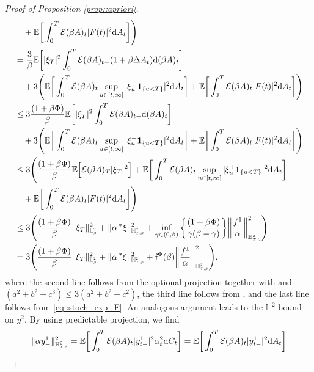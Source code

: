 \documentclass[10pt]{article} %
\newcommand\cE{\mathcal E}
\newcommand{\smalltext}[1]{\text{\fontsize{4}{4}\selectfont$#1$}}
\newcommand\ff{\mathfrak f}
\def \E{\mathbb{E}}
\def \H{\mathbb{H}}
\def \L{\mathbb{L}}
\newcommand{\brs}[1]{\prescript{\ast}{}{#1}}
\newcommand{\1}{\mathbf{1}}
\def\d{\mathrm{d}}
\begin{document}
\begin{proof}[Proof of Proposition \ref{prop::apriori}]
\begin{align*}
	&\quad+ \E \bigg[ \int_0^T \cE(\beta A)_t |F(t)|^2 \d A_t \bigg] \Bigg) \\
	&= \frac{3}{\beta}\E \bigg[ |\xi_T|^2 \int_0^T \cE(\beta A)_{t-}(1+\beta\Delta A_t) \d (\beta A)_t \bigg] \\
	&\quad+3\Bigg( \E \bigg[ \int_0^T \cE(\beta A)_t \sup_{u \in [t,\infty]}|\xi^+_u \mathbf{1}_{\{u < T\}}|^2 \d A_t \bigg] + \E \bigg[ \int_0^T \cE(\beta A)_t |F(t)|^2 \d A_t \bigg] \Bigg) \\
	&\leq 3\frac{(1+\beta\Phi)}{\beta}\E \bigg[ |\xi_T|^2 \int_0^T \cE(\beta A)_{t-} \d (\beta A)_t \bigg]\\
	&\quad+ 3\Bigg( \E \bigg[ \int_0^T \cE(\beta A)_t \sup_{u \in [t,\infty]}|\xi^+_u \mathbf{1}_{\{u < T\}}|^2 \d A_t \bigg] +\E \bigg[ \int_0^T \cE(\beta A)_t |F(t)|^2 \d A_t \bigg] \Bigg) \\
	&\leq 3\Bigg(\frac{(1+\beta\Phi)}{\beta}\E \Big[ \cE(\beta A)_T|\xi_T|^2 \Big] + \E \bigg[ \int_0^T \cE(\beta A)_t \sup_{u \in [t,\infty]}|\xi^+_u \mathbf{1}_{\{u < T\}}|^2 \d A_t \bigg] \\
	&\quad+ \E \bigg[ \int_0^T \cE(\beta A)_t |F(t)|^2 \d A_t \bigg] \Bigg) \\
	&\leq 3 \Bigg( \frac{(1+\beta\Phi)}{\beta} \|\xi_T\|^2_{\L^\smalltext{2}_\smalltext{\beta}} + \|\alpha\brs{\xi}\|^2_{\H^\smalltext{2}_{\smalltext{T}\smalltext{,}\smalltext{\beta}}} +  \inf_{\gamma \in (0,\beta)}\bigg\{\frac{(1+\beta\Phi)}{\gamma(\beta - \gamma)}\bigg\} \bigg\| \frac{f^1}{\alpha} \bigg\|^2_{\H^{\smalltext{2}}_{\smalltext{T}\smalltext{,}\smalltext{\beta}}} \Bigg) \\
	&= 3 \Bigg( \frac{(1+\beta\Phi)}{\beta} \|\xi_T\|^2_{\L^\smalltext{2}_\smalltext{\beta}} + \|\alpha\brs{\xi}\|^2_{\H^\smalltext{2}_{\smalltext{T}\smalltext{,}\smalltext{\beta}}} +  \ff^\Phi(\beta) \bigg\| \frac{f^1}{\alpha} \bigg\|^2_{\H^{\smalltext{2}}_{\smalltext{T}\smalltext{,}\smalltext{\beta}}} \Bigg),
\end{align*}
where the second line follows from the optional projection together with  and $(a^2+b^2+c^3) \leq 3(a^2+b^2+c^2)$, the third line follows from \cite[Theorem VI.57]{dellacherie1982probabilities}, and the last line follows from \eqref{eq::stoch_exp_F}.
An analogous argument leads to the $\H^2$-bound on $y^2$. By using predictable projection, we find
\begin{align*}
	\|\alpha y^1_-\|^2_{\H^2_{\smalltext{T}\smalltext{,}\smalltext{\beta}}} = \E \bigg[ \int_0^T \cE(\beta A)_t |y^1_{t-}|^2 \alpha^2_t \d C_t \bigg] 
	&= \E \bigg[ \int_0^T \cE(\beta A)_t |y^1_{t-}|^2 \d A_t \bigg] \\

\end{align*}
\end{proof}
\end{document}
